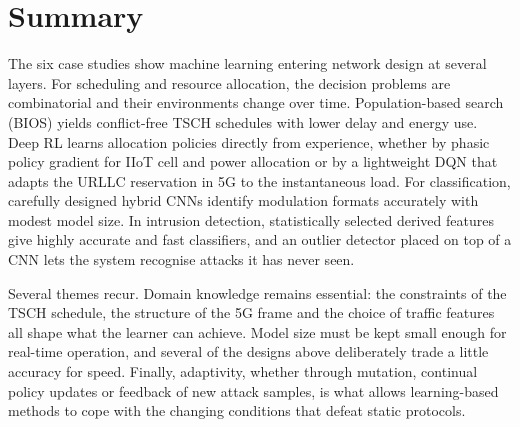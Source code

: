 \section{Summary}
\label{sec:ml_summary}

The six case studies show machine learning entering network design at several layers. For scheduling and resource allocation, the decision problems are combinatorial and their environments change over time. Population-based search (BIOS) yields conflict-free TSCH schedules with lower delay and energy use. Deep RL learns allocation policies directly from experience, whether by phasic policy gradient for IIoT cell and power allocation or by a lightweight DQN that adapts the URLLC reservation in 5G to the instantaneous load. For classification, carefully designed hybrid CNNs identify modulation formats accurately with modest model size. In intrusion detection, statistically selected derived features give highly accurate and fast classifiers, and an outlier detector placed on top of a CNN lets the system recognise attacks it has never seen.

Several themes recur. Domain knowledge remains essential: the constraints of the TSCH schedule, the structure of the 5G frame and the choice of traffic features all shape what the learner can achieve. Model size must be kept small enough for real-time operation, and several of the designs above deliberately trade a little accuracy for speed. Finally, adaptivity, whether through mutation, continual policy updates or feedback of new attack samples, is what allows learning-based methods to cope with the changing conditions that defeat static protocols.
